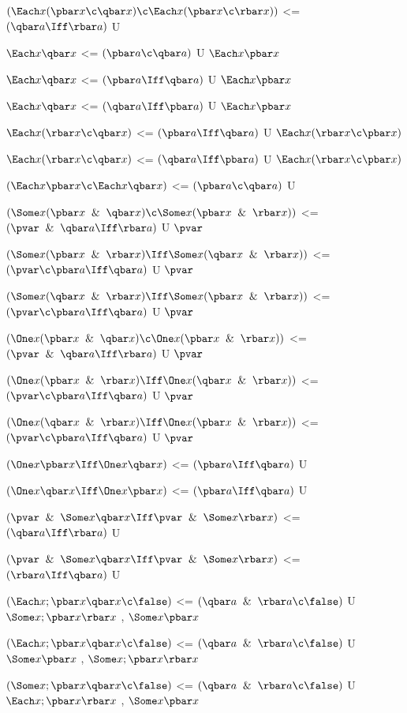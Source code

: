 $(\Each x (\pbar x \c \qbar x) \c \Each x (\pbar x \c \rbar x))$ <= $(\qbar a \Iff \rbar a)$ U

$\Each x \qbar x$ <= $(\pbar a \c \qbar a)$ U $\Each x\pbar x$

$\Each x \qbar x$ <= $(\pbar a \Iff\qbar a)$ U $\Each x\pbar x$

$\Each x \qbar x$ <= $(\qbar a \Iff\pbar a)$ U $\Each x\pbar x$

$\Each x(\rbar x \c  \qbar x)$ <= $(\pbar a \Iff\qbar a)$ U $\Each x(\rbar x \c \pbar x)$

$\Each x(\rbar x \c  \qbar x)$ <= $(\qbar a \Iff\pbar a)$ U $\Each x(\rbar x \c \pbar x)$

$(\Each x \pbar x \c \Each x \qbar x)$ <= $(\pbar a \c \qbar a)$ U

$(\Some x (\pbar x \And \qbar x) \c \Some x (\pbar x \And \rbar x))$ <= $(\pvar \And \qbar a \Iff \rbar a)$ U $\pvar$

$(\Some x (\pbar x \And \rbar x) \Iff \Some x(\qbar x \And \rbar x))$ <= $(\pvar \c \pbar a \Iff \qbar a)$ U $\pvar$

$(\Some x (\qbar x \And \rbar x) \Iff \Some x(\pbar x \And \rbar x))$ <= $(\pvar \c \pbar a \Iff \qbar a)$ U $\pvar$

$(\One x (\pbar x \And \qbar x) \c \One x (\pbar x \And \rbar x))$ <= $(\pvar \And \qbar a \Iff \rbar a)$ U $\pvar$

$(\One x (\pbar x \And \rbar x) \Iff \One x(\qbar x \And \rbar x))$ <= $(\pvar \c \pbar a \Iff \qbar a)$ U $\pvar$

$(\One x (\qbar x \And \rbar x) \Iff \One x(\pbar x \And \rbar x))$ <= $(\pvar \c \pbar a \Iff \qbar a)$ U $\pvar$

$(\One x\pbar x \Iff\One x\qbar x)$ <= $(\pbar a\Iff\qbar a)$ U

$(\One x\qbar x \Iff\One x\pbar x)$ <= $(\pbar a\Iff\qbar a)$ U

$(\pvar \And \Some x \qbar x \Iff \pvar \And \Some x \rbar x)$ <= $(\qbar a \Iff \rbar a)$ U

$(\pvar \And \Some x \qbar x \Iff \pvar \And \Some x \rbar x)$ <= $(\rbar a \Iff \qbar a)$ U

$(\Each x ; \pbar x \qbar x \c \false)$ <= $(\qbar a \And \rbar a \c \false)$ U $\Some x; \pbar x \rbar x$ , $\Some x \pbar x$

$(\Each x ; \pbar x \qbar x \c \false)$ <= $(\qbar a \And \rbar a \c \false)$ U  $\Some x \pbar x $ , $\Some x; \pbar x \rbar x$

$(\Some x ; \pbar x \qbar x \c \false)$ <= $(\qbar a \And \rbar a \c \false)$ U $\Each x; \pbar x \rbar x$ , $\Some x \pbar x$

